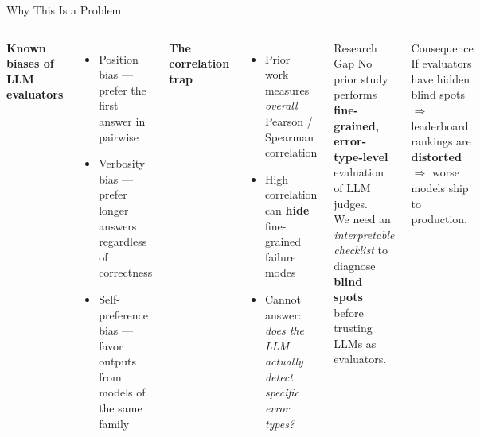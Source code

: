 \documentclass[aspectratio=169,10pt]{beamer}
\begin{document}
\begin{frame}{Why This Is a Problem}
  \begin{columns}[T]
      \textbf{Known biases of LLM evaluators}
      \begin{itemize}
        \item \alert{Position bias} — prefer the first answer in pairwise
        \item \alert{Verbosity bias} — prefer longer answers regardless of correctness
        \item \alert{Self-preference bias} — favor outputs from models of the same family
      \end{itemize}

      \vspace{0.5em}
      \textbf{The correlation trap}
      \begin{itemize}
        \item Prior work measures \emph{overall} Pearson / Spearman correlation
        \item High correlation can \textbf{hide} fine-grained failure modes
        \item Cannot answer: \emph{does the LLM actually detect specific error types?}
      \end{itemize}

      \begin{alertblock}{Research Gap}
        No prior study performs \textbf{fine-grained, error-type-level} evaluation of LLM judges.\\[0.4em]
        We need an \emph{interpretable checklist} to diagnose \textbf{blind spots} before trusting LLMs as evaluators.
      \end{alertblock}

      \vspace{0.4em}
      \begin{block}{Consequence}
        If evaluators have hidden blind spots $\Rightarrow$ leaderboard rankings are \textbf{distorted} $\Rightarrow$ worse models ship to production.
      \end{block}
  \end{columns}
\end{frame}
\end{document}
